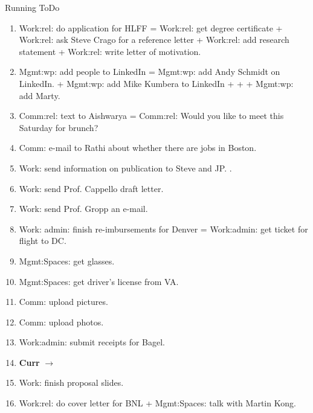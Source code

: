 \begin{columns}
\begin{column}{0.6\linewidth}
\begin{block}{Running ToDo}
\begin{enumerate}
       
      \item \tiny Work:rel: do application for HLFF = Work:rel: get degree
        certificate + Work:rel: ask Steve Crago for a reference letter + Work:rel: add research statement + Work:rel: write
        letter of motivation.   
 
      \item \tiny Mgmt:wp: add people to LinkedIn =  Mgmt:wp: add Andy
        Schmidt on LinkedIn. +  Mgmt:wp: add Mike Kumbera to LinkedIn
        +   +  + Mgmt:wp: add Marty. 
          

      \item \tiny Comm:rel: text to Aishwarya = Comm:rel: Would you like to meet this Saturday for brunch? 

      \item \tiny Comm: e-mail to Rathi about whether there are jobs in Boston. 

      \item \tiny Work: send information on publication to Steve and JP.  .

      \item \tiny Work: send Prof. Cappello draft letter. 
      
      \item \tiny Work: send Prof. Gropp an e-mail. 
       
        
      \item \tiny Work: admin: finish re-imbursements for Denver = Work:admin: get ticket for flight to DC.
        
      \item \tiny Mgmt:Spaces: get glasses. 
      \item \tiny Mgmt:Spaces: get driver's license from VA. 
        
      \item \tiny Comm: upload pictures. 
      \item \tiny Comm: upload photos. 
        
      \item \tiny Work:admin: submit receipts for Bagel. 
        
        \tiny \item[] \tiny \textbf{Curr} $\rightarrow$
        
      \item \tiny Work: finish proposal slides. 
      \item \tiny Work:rel: do cover letter for BNL + Mgmt:Spaces: talk with Martin Kong.
        

\end{enumerate}
\end{block}
\end{column}
\end{columns}
